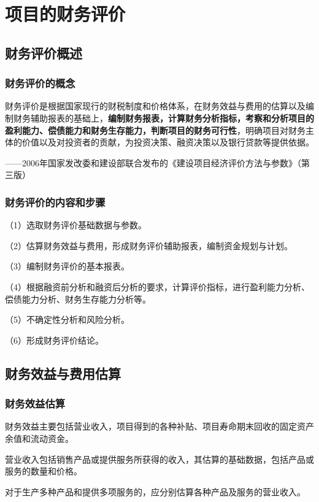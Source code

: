 \chapter{项目的财务评价}
\section{财务评价概述}
\subsection{财务评价的概念}
财务评价是根据国家现行的财税制度和价格体系，在财务效益与费用的估算以及编制财务辅助报表的基础上，\textbf{编制财务报表，计算财务分析指标，考察和分析项目的盈利能力、偿债能力和财务生存能力，判断项目的财务可行性}，明确项目对财务主体的价值以及对投资者的贡献，为投资决策、融资决策以及银行贷款等提供依据。

  ——2006年国家发改委和建设部联合发布的《建设项目经济评价方法与参数》（第三版）

\subsection{财务评价的内容和步骤}
（1）选取财务评价基础数据与参数。

（2）估算财务效益与费用，形成财务评价辅助报表，编制资金规划与计划。

（3）编制财务评价的基本报表。

（4）根据融资前分析和融资后分析的要求，计算评价指标，进行盈利能力分析、偿债能力分析、财务生存能力分析等。

（5）不确定性分析和风险分析。

（6）形成财务评价结论。

\section{财务效益与费用估算}
\subsection{财务效益估算}
财务效益主要包括营业收入，项目得到的各种补贴、项目寿命期末回收的固定资产余值和流动资金。

营业收入包括销售产品或提供服务所获得的收入，其估算的基础数据，包括产品或服务的数量和价格。

对于生产多种产品和提供多项服务的，应分别估算各种产品及服务的营业收入。

